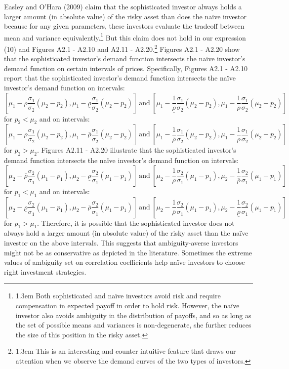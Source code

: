\documentclass[10pt]{article}
\begin{document}
Easley and O'Hara (2009) claim that the sophisticated investor always holds a larger amount (in absolute value) of the risky asset than does the na\"ive investor because for any given parameters, these investors evaluate the tradeoff between mean and variance equivalently.\footnote{\baselineskip1.3em Both sophisticated and na\"ive investors avoid risk and require compensation in expected payoff in order to hold risk. However, the na\"ive investor also avoids ambiguity in the distribution of payoffs, and so as long as the set of possible means and variances is non-degenerate, she further reduces the size of this position in the risky asset.} But this claim does not hold in our expression (10) and Figures A2.1 - A2.10 and A2.11 - A2.20.\footnote{\baselineskip1.3em This is an interesting and counter intuitive feature that draws our attention when we observe the demand curves of the two types of investors.} Figures A2.1 - A2.20 show that the sophisticated investor's demand function intersects the na\"ive investor's demand function on certain intervals of prices. Specifically, Figures A2.1 - A2.10 report that the sophisticated investor's demand function intersects the na\"ive investor's demand function on intervals:
$$ \left[ \mu_1 - \overline{\rho} \dfrac{\sigma_1}{\sigma_2} (\mu_2 - p_2), \mu_1 - \underline{\rho} \dfrac{\sigma_1}{\sigma_2} (\mu_2 - p_2) \right] \ \text{and} \ \left[ \mu_1 - \dfrac1{\underline{\rho}} \dfrac{\sigma_1}{\sigma_2} (\mu_2 - p_2), \mu_1 - \dfrac1{\overline{\rho}} \dfrac{\sigma_1}{\sigma_2} (\mu_2 - p_2) \right] $$
for $ p_2 < \mu_2 $ and on intervals:
$$ \left[ \mu_1 - \underline{\rho} \dfrac{\sigma_1}{\sigma_2} (\mu_2 - p_2), \mu_1 - \overline{\rho} \dfrac{\sigma_1}{\sigma_2} (\mu_2 - p_2) \right] \ \text{and} \ \left[ \mu_1 - \dfrac1{\overline{\rho}} \dfrac{\sigma_1}{\sigma_2} (\mu_2 - p_2), \mu_1 - \dfrac1{\underline{\rho}} \dfrac{\sigma_1}{\sigma_2} (\mu_2 - p_2) \right] $$
for $ p_2 > \mu_2 $. Figures A2.11 - A2.20 illustrate that the sophisticated investor's demand function intersects the na\"ive investor's demand function on intervals:
$$ \left[ \mu_2 - \overline{\rho} \dfrac{\sigma_2}{\sigma_1} (\mu_1 - p_1), \mu_2 - \underline{\rho} \dfrac{\sigma_2}{\sigma_1} (\mu_1 - p_1) \right] \ \text{and} \ \left[ \mu_2 - \dfrac1{\underline{\rho}} \dfrac{\sigma_2}{\sigma_1} (\mu_1 - p_1), \mu_2 - \dfrac1{\overline{\rho}} \dfrac{\sigma_2}{\sigma_1} (\mu_1 - p_1) \right] $$
for $ p_1 < \mu_1 $ and on intervals:
$$ \left[ \mu_2 - \underline{\rho} \dfrac{\sigma_2}{\sigma_1} (\mu_1 - p_1), \mu_2 - \overline{\rho} \dfrac{\sigma_2}{\sigma_1} (\mu_1 - p_1) \right] \ \text{and} \ \left[ \mu_2 - \dfrac1{\overline{\rho}} \dfrac{\sigma_2}{\sigma_1} (\mu_1 - p_1), \mu_2 - \dfrac1{\underline{\rho}} \dfrac{\sigma_2}{\sigma_1} (\mu_1 - p_1) \right] $$
for $ p_1 > \mu_1 $. Therefore, it is possible that the sophisticated investor does not always hold a larger amount (in absolute value) of the risky asset than the na\"ive investor on the above intervals. This suggests that ambiguity-averse investors might not be as conservative as depicted in the literature. Sometimes the extreme values of ambiguity set on correlation coefficients help na\"ive investors to choose right investment strategies.
\end{document}
